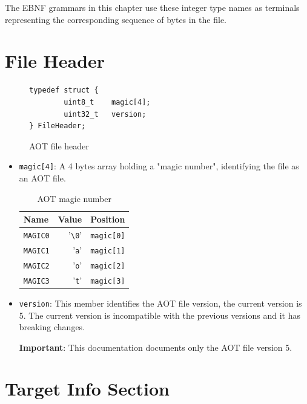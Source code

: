 \documentclass{article}
\begin{document}
The EBNF grammars in this chapter use these integer type names as terminals representing the corresponding sequence of bytes in the file.

\section{File Header}

\begin{figure}[H]
\begin{verbatim}
typedef struct {
        uint8_t    magic[4];
        uint32_t   version;
} FileHeader;
\end{verbatim}
\caption{AOT file header}
\label{fig:file-header}
\end{figure}

\begin{itemize}
    \item \verb|magic[4]|: A 4 bytes array holding a "magic number", identifying the file as an AOT file.
        \begin{table}[H]
        \centering
        \begin{tabular}{lrl}
            \hline
            Name & Value & Position \\
            \hline
            \verb|MAGIC0| & '\verb|\0|' & \verb|magic[0]| \\
            \verb|MAGIC1| & '\verb|a|'  & \verb|magic[1]| \\
            \verb|MAGIC2| & '\verb|o|'  & \verb|magic[2]| \\
            \verb|MAGIC3| & '\verb|t|'  & \verb|magic[3]| \\
            \hline
        \end{tabular}
        \caption{AOT magic number}
        \end{table}

    \item \verb|version|: This member identifies the AOT file version, the current version is 5.
        The current version is incompatible with the previous versions and it has breaking changes.

        \medskip
        \textbf{Important}: This documentation documents only the AOT file version 5.
\end{itemize}

\section{Target Info Section} \label{sec:target-info}
\end{document}
